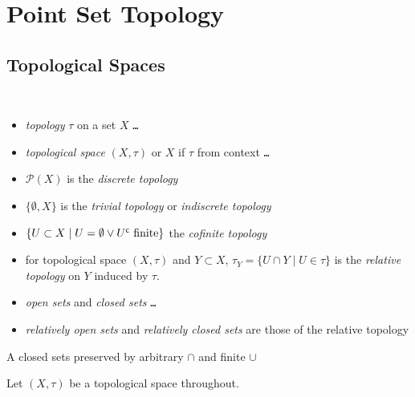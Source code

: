 \chapter{Point Set Topology}

\section{Topological Spaces}
\begin{defn}\ 
  \begin{itemize}
  \item \emph{topology} $\tau$ on a set $X$ \texttt{\ldots}
  \item \emph{topological space} ${(X,\tau)}$ or $X$ if $\tau$
    from context \texttt{\ldots}
  \item ${\mathscr{P}(X)}$ is the \emph{discrete topology}
  \item ${\{\emptyset, X\}}$ is the
    \emph{trivial topology} or \emph{indiscrete topology}
  \item
    ${\{U\subset X\mid U=\emptyset \lor {U}^{\mathsf{c}}\text{ finite}\}}$
    the \emph{cofinite topology}
  \item for topological space ${(X,\tau)}$ and ${Y\subset X}$,
    ${\tau_Y=\{U\cap Y\mid U\in\tau\}}$ is the
    \emph{relative topology} on $Y$ induced by $\tau$.
  \item \emph{open sets} and \emph{closed sets} \texttt{\ldots}
  \item \emph{relatively open sets} and \emph{relatively closed sets}
    are those of the relative topology
  \end{itemize}
\end{defn}

\begin{rem}{A}
  closed sets preserved by arbitrary $\cap$ and finite $\cup$
\end{rem}

Let ${(X,\tau)}$ be a topological space throughout.

